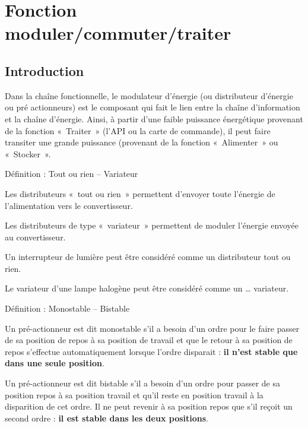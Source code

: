 
\section{Fonction moduler/commuter/traiter}\label{fonction-modulercommuter}

\hypertarget{introduction}{%
\subsection{Introduction}\label{introduction}}

Dans la chaîne fonctionnelle, le modulateur d'énergie (ou distributeur
d'énergie ou pré actionneurs) est le composant qui fait le lien entre la
chaîne d'information et la chaîne d'énergie. Ainsi, à partir d'une
faible puissance énergétique provenant de la fonction «~Traiter~» (l'API
ou la carte de commande), il peut faire transiter une grande puissance
(provenant de la fonction «~Alimenter~» ou «~Stocker~».

\begin{defi}{Définition : Tout ou rien -- Variateur}

Les distributeurs «~tout ou rien~» permettent d'envoyer toute l'énergie
de l'alimentation vers le convertisseur.

Les distributeurs de type «~variateur~» permettent de moduler l'énergie
envoyée au convertisseur. 

\end{defi}

\begin{exemple}

Un interrupteur de lumière peut être considéré comme un distributeur
tout ou rien.

Le variateur d'une lampe halogène peut être considéré comme un \ldots{}
variateur. \\
\end{exemple}

\begin{defi}{Définition : Monostable -- Bistable}

Un pré-actionneur est dit monostable s'il a besoin d'un ordre pour le
faire passer de sa position de repos à sa position de travail et que le
retour à sa position de repos s'effectue automatiquement lorsque l'ordre
disparait : \textbf{il n'est stable que dans une seule position}.

Un pré-actionneur est dit bistable s'il a besoin d'un ordre pour passer
de sa position repos à sa position travail et qu'il reste en position
travail à la disparition de cet ordre. Il ne peut revenir à sa position
repos que s'il reçoit un second ordre : \textbf{il est stable dans les
deux positions}. \\

\end{defi}

